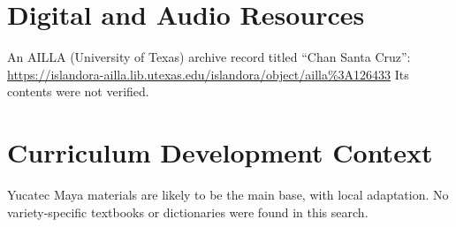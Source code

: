 \documentclass[12pt]{article}
\begin{document}
\section{Digital and Audio Resources}
An AILLA (University of Texas) archive record titled ``Chan Santa Cruz'': \url{https://islandora-ailla.lib.utexas.edu/islandora/object/ailla%3A126433}
Its contents were not verified.

\section{Curriculum Development Context}
Yucatec Maya materials are likely to be the main base, with local adaptation. No variety-specific textbooks or dictionaries were found in this search.
\end{document}
